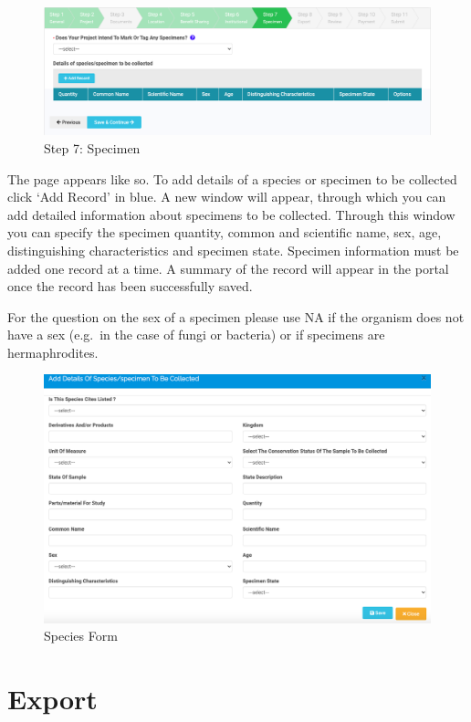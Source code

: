 \documentclass[
]{book}
\begin{document}
\begin{figure}
\centering
\includegraphics{images/specimen_section.png}
\caption{Step 7: Specimen}
\end{figure}

The page appears like so. To add details of a species or specimen to be collected click `Add Record' in blue. A new window will appear, through which you can add detailed information about specimens to be collected. Through this window you can specify the specimen quantity, common and scientific name, sex, age, distinguishing characteristics and specimen state. Specimen information must be added one record at a time. A summary of the record will appear in the portal once the record has been successfully saved.

For the question on the sex of a specimen please use NA if the organism does not have a sex (e.g.~in the case of fungi or bacteria) or if specimens are hermaphrodites.

\begin{figure}
\centering
\includegraphics{images/species_form.png}
\caption{Species Form}
\end{figure}

\hypertarget{export}{%
\chapter{Export}\label{export}}
\end{document}
